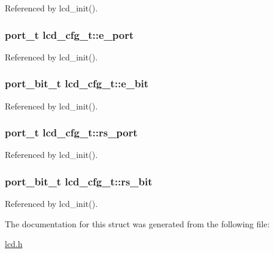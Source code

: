 Referenced by lcd\_\-init().\hypertarget{structlcd__cfg__t_77a1c9d62a0406805a4496e9b9f7badb}{
\subsubsection{\setlength{\rightskip}{0pt plus 5cm}port\_\-t {\bf lcd\_\-cfg\_\-t::e\_\-port}}}
\label{structlcd__cfg__t_77a1c9d62a0406805a4496e9b9f7badb}




Referenced by lcd\_\-init().\hypertarget{structlcd__cfg__t_8fc21664b25bd462f7524276cef55911}{
\subsubsection{\setlength{\rightskip}{0pt plus 5cm}port\_\-bit\_\-t {\bf lcd\_\-cfg\_\-t::e\_\-bit}}}
\label{structlcd__cfg__t_8fc21664b25bd462f7524276cef55911}




Referenced by lcd\_\-init().\hypertarget{structlcd__cfg__t_5c24fb95552caef42e1babc3cec17ba6}{
\subsubsection{\setlength{\rightskip}{0pt plus 5cm}port\_\-t {\bf lcd\_\-cfg\_\-t::rs\_\-port}}}
\label{structlcd__cfg__t_5c24fb95552caef42e1babc3cec17ba6}




Referenced by lcd\_\-init().\hypertarget{structlcd__cfg__t_e4f781d2a465b21d8bab29a6b99c1ed8}{
\subsubsection{\setlength{\rightskip}{0pt plus 5cm}port\_\-bit\_\-t {\bf lcd\_\-cfg\_\-t::rs\_\-bit}}}
\label{structlcd__cfg__t_e4f781d2a465b21d8bab29a6b99c1ed8}




Referenced by lcd\_\-init().

The documentation for this struct was generated from the following file:\begin{CompactItemize}
\item 
\hyperlink{lcd_8h}{lcd.h}\end{CompactItemize}
